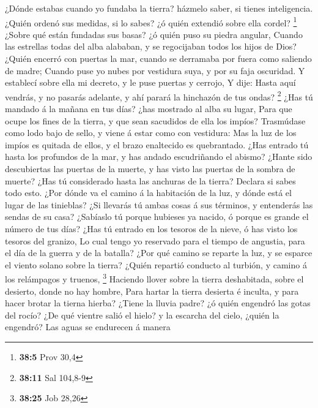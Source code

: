  ¿Dónde estabas cuando yo fundaba la tierra? házmelo saber,
si tienes inteligencia.  ¿Quién ordenó sus medidas, si lo
sabes? ¿ó quién extendió sobre ella cordel? \footnote{\textbf{38:5} Prov
  30,4}  ¿Sobre qué están fundadas sus basas? ¿ó quién puso
su piedra angular,  Cuando las estrellas todas del alba
alababan, y se regocijaban todos los hijos de Dios?  ¿Quién
encerró con puertas la mar, cuando se derramaba por fuera como saliendo
de madre;  Cuando puse yo nubes por vestidura suya, y por su
faja oscuridad.  Y establecí sobre ella mi decreto, y le
puse puertas y cerrojo,  Y dije: Hasta aquí vendrás, y no
pasarás adelante, y ahí parará la hinchazón de tus ondas? \footnote{\textbf{38:11}
  Sal 104,8-9}  ¿Has tú mandado á la mañana en tus días?
¿has mostrado al alba su lugar,  Para que ocupe los fines
de la tierra, y que sean sacudidos de ella los impíos? 
Trasmúdase como lodo bajo de sello, y viene á estar como con vestidura:
 Mas la luz de los impíos es quitada de ellos, y el brazo
enaltecido es quebrantado.  ¿Has entrado tú hasta los
profundos de la mar, y has andado escudriñando el abismo? 
¿Hante sido descubiertas las puertas de la muerte, y has visto las
puertas de la sombra de muerte?  ¿Has tú considerado hasta
las anchuras de la tierra? Declara si sabes todo esto. 
¿Por dónde va el camino á la habitación de la luz, y dónde está el lugar
de las tinieblas?  ¿Si llevarás tú ambas cosas á sus
términos, y entenderás las sendas de su casa?  ¿Sabíaslo tú
porque hubieses ya nacido, ó porque es grande el número de tus días?
 ¿Has tú entrado en los tesoros de la nieve, ó has visto
los tesoros del granizo,  Lo cual tengo yo reservado para
el tiempo de angustia, para el día de la guerra y de la batalla?
 ¿Por qué camino se reparte la luz, y se esparce el viento
solano sobre la tierra?  ¿Quién repartió conducto al
turbión, y camino á los relámpagos y truenos, \footnote{\textbf{38:25}
  Job 28,26}  Haciendo llover sobre la tierra deshabitada,
sobre el desierto, donde no hay hombre,  Para hartar la
tierra desierta é inculta, y para hacer brotar la tierna hierba?
 ¿Tiene la lluvia padre? ¿ó quién engendró las gotas del
rocío?  ¿De qué vientre salió el hielo? y la escarcha del
cielo, ¿quién la engendró?  Las aguas se endurecen á manera
